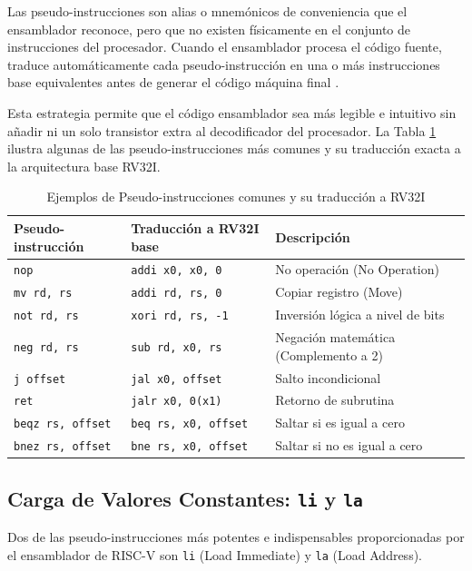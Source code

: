 Las pseudo-instrucciones son alias o mnemónicos de conveniencia que el ensamblador reconoce, pero que no existen físicamente en el conjunto de instrucciones del procesador. Cuando el ensamblador procesa el código fuente, traduce automáticamente cada pseudo-instrucción en una o más instrucciones base equivalentes antes de generar el código máquina final \cite{waterman2014riscv}.

Esta estrategia permite que el código ensamblador sea más legible e intuitivo sin añadir ni un solo transistor extra al decodificador del procesador. La Tabla \ref{tab:pseudo_instrucciones} ilustra algunas de las pseudo-instrucciones más comunes y su traducción exacta a la arquitectura base RV32I.

\begin{table}[h!]
\centering
\caption{Ejemplos de Pseudo-instrucciones comunes y su traducción a RV32I}
\label{tab:pseudo_instrucciones}
\begin{tabular}{|l|l|l|}
\hline
\textbf{Pseudo-instrucción} & \textbf{Traducción a RV32I base} & \textbf{Descripción} \\ \hline
\texttt{nop} & \texttt{addi x0, x0, 0} & No operación (No Operation) \\ \hline
\texttt{mv rd, rs} & \texttt{addi rd, rs, 0} & Copiar registro (Move) \\ \hline
\texttt{not rd, rs} & \texttt{xori rd, rs, -1} & Inversión lógica a nivel de bits \\ \hline
\texttt{neg rd, rs} & \texttt{sub rd, x0, rs} & Negación matemática (Complemento a 2) \\ \hline
\texttt{j offset} & \texttt{jal x0, offset} & Salto incondicional \\ \hline
\texttt{ret} & \texttt{jalr x0, 0(x1)} & Retorno de subrutina \\ \hline
\texttt{beqz rs, offset} & \texttt{beq rs, x0, offset} & Saltar si es igual a cero \\ \hline
\texttt{bnez rs, offset} & \texttt{bne rs, x0, offset} & Saltar si no es igual a cero \\ \hline
\end{tabular}
\end{table}

\subsection{Carga de Valores Constantes: \texttt{li} y \texttt{la}}
Dos de las pseudo-instrucciones más potentes e indispensables proporcionadas por el ensamblador de RISC-V son \texttt{li} (Load Immediate) y \texttt{la} (Load Address).

